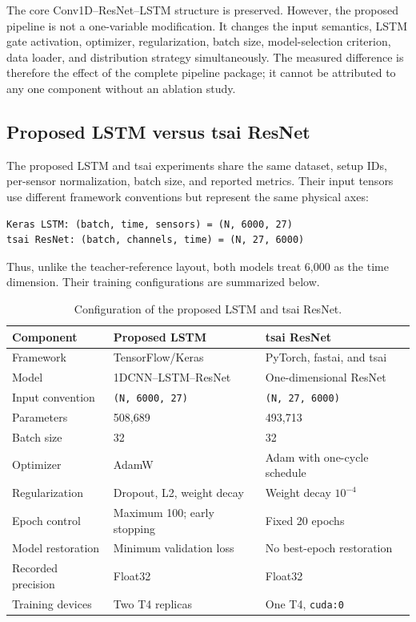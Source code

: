 \documentclass[11pt,a4paper]{article}
\begin{document}
The core Conv1D--ResNet--LSTM structure is preserved. However, the proposed
pipeline is not a one-variable modification. It changes the input semantics,
LSTM gate activation, optimizer, regularization, batch size, model-selection
criterion, data loader, and distribution strategy simultaneously. The measured
difference is therefore the effect of the complete pipeline package; it cannot
be attributed to any one component without an ablation study.

\subsection{Proposed LSTM versus tsai ResNet}

The proposed LSTM and tsai experiments share the same dataset, setup IDs,
per-sensor normalization, batch size, and reported metrics. Their input tensors
use different framework conventions but represent the same physical axes:

\begin{lstlisting}
Keras LSTM: (batch, time, sensors) = (N, 6000, 27)
tsai ResNet: (batch, channels, time) = (N, 27, 6000)
\end{lstlisting}

Thus, unlike the teacher-reference layout, both models treat 6,000 as the time
dimension. Their training configurations are summarized below.

\begin{table}[htbp]
\centering
\caption{Configuration of the proposed LSTM and tsai ResNet.}
\begin{tabularx}{\textwidth}{@{}p{3.5cm}XX@{}}
\toprule
\textbf{Component} & \textbf{Proposed LSTM} & \textbf{tsai ResNet} \\
\midrule
Framework & TensorFlow/Keras & PyTorch, fastai, and tsai \\
Model & 1DCNN--LSTM--ResNet & One-dimensional ResNet \\
Input convention & \texttt{(N, 6000, 27)} & \texttt{(N, 27, 6000)} \\
Parameters & 508,689 & 493,713 \\
Batch size & 32 & 32 \\
Optimizer & AdamW & Adam with one-cycle schedule \\
Regularization & Dropout, L2, weight decay & Weight decay \(10^{-4}\) \\
Epoch control & Maximum 100; early stopping & Fixed 20 epochs \\
Model restoration & Minimum validation loss & No best-epoch restoration \\
Recorded precision & Float32 & Float32 \\
Training devices & Two T4 replicas & One T4, \texttt{cuda:0} \\
\bottomrule
\end{tabularx}
\end{table}
\end{document}
